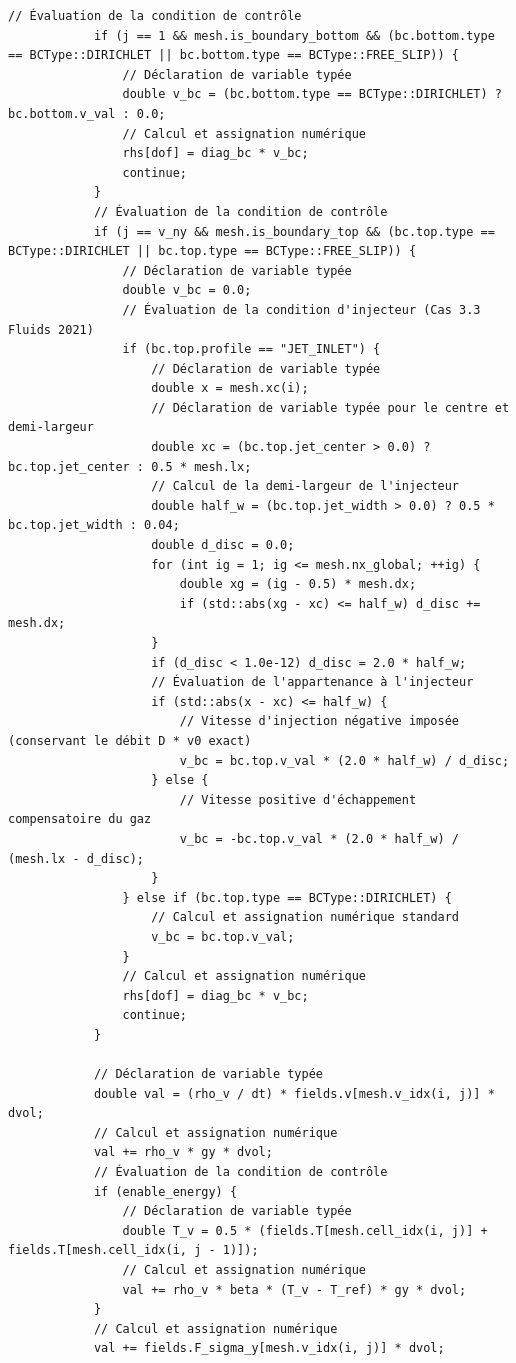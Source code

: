 \documentclass[10pt,a4paper,oneside]{book}
\begin{document}
\begin{lstlisting}[language={[11]C++}]
            // Évaluation de la condition de contrôle
            if (j == 1 && mesh.is_boundary_bottom && (bc.bottom.type == BCType::DIRICHLET || bc.bottom.type == BCType::FREE_SLIP)) {
                // Déclaration de variable typée
                double v_bc = (bc.bottom.type == BCType::DIRICHLET) ? bc.bottom.v_val : 0.0;
                // Calcul et assignation numérique
                rhs[dof] = diag_bc * v_bc;
                continue;
            }
            // Évaluation de la condition de contrôle
            if (j == v_ny && mesh.is_boundary_top && (bc.top.type == BCType::DIRICHLET || bc.top.type == BCType::FREE_SLIP)) {
                // Déclaration de variable typée
                double v_bc = 0.0;
                // Évaluation de la condition d'injecteur (Cas 3.3 Fluids 2021)
                if (bc.top.profile == "JET_INLET") {
                    // Déclaration de variable typée
                    double x = mesh.xc(i);
                    // Déclaration de variable typée pour le centre et demi-largeur
                    double xc = (bc.top.jet_center > 0.0) ? bc.top.jet_center : 0.5 * mesh.lx;
                    // Calcul de la demi-largeur de l'injecteur
                    double half_w = (bc.top.jet_width > 0.0) ? 0.5 * bc.top.jet_width : 0.04;
                    double d_disc = 0.0;
                    for (int ig = 1; ig <= mesh.nx_global; ++ig) {
                        double xg = (ig - 0.5) * mesh.dx;
                        if (std::abs(xg - xc) <= half_w) d_disc += mesh.dx;
                    }
                    if (d_disc < 1.0e-12) d_disc = 2.0 * half_w;
                    // Évaluation de l'appartenance à l'injecteur
                    if (std::abs(x - xc) <= half_w) {
                        // Vitesse d'injection négative imposée (conservant le débit D * v0 exact)
                        v_bc = bc.top.v_val * (2.0 * half_w) / d_disc;
                    } else {
                        // Vitesse positive d'échappement compensatoire du gaz
                        v_bc = -bc.top.v_val * (2.0 * half_w) / (mesh.lx - d_disc);
                    }
                } else if (bc.top.type == BCType::DIRICHLET) {
                    // Calcul et assignation numérique standard
                    v_bc = bc.top.v_val;
                }
                // Calcul et assignation numérique
                rhs[dof] = diag_bc * v_bc;
                continue;
            }

            // Déclaration de variable typée
            double val = (rho_v / dt) * fields.v[mesh.v_idx(i, j)] * dvol;
            // Calcul et assignation numérique
            val += rho_v * gy * dvol;
            // Évaluation de la condition de contrôle
            if (enable_energy) {
                // Déclaration de variable typée
                double T_v = 0.5 * (fields.T[mesh.cell_idx(i, j)] + fields.T[mesh.cell_idx(i, j - 1)]);
                // Calcul et assignation numérique
                val += rho_v * beta * (T_v - T_ref) * gy * dvol;
            }
            // Calcul et assignation numérique
            val += fields.F_sigma_y[mesh.v_idx(i, j)] * dvol;


\end{lstlisting}
\end{document}
